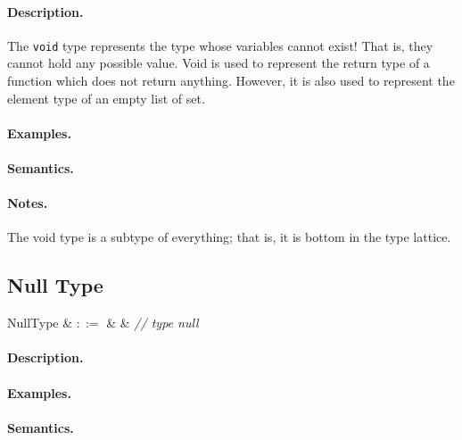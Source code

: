 \paragraph{Description.} The \lstinline{void} type represents the type whose variables cannot exist! That is, they cannot hold any possible value. Void is used to represent the return type of a function which does not return anything. However, it is also
used to represent the element type of an empty list of set. 

\paragraph{Examples.}

\paragraph{Semantics.}

\paragraph{Notes.} The void type is a subtype of everything; that is, it is bottom in the type lattice.


\subsection{Null Type}

\begin{syntax}
  NullType & $::=$ &  & {\em // type null}\\
\end{syntax}

\paragraph{Description.}

\paragraph{Examples.}

\paragraph{Semantics.}

